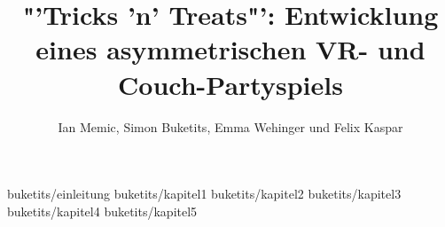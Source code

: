 \documentclass[diplom,german]{hgbthesis}
\begin{document}

%
%
%

%	

\title{"'Tricks 'n' Treats"': Entwicklung eines asymmetrischen VR- und Couch-Partyspiels}
\author{Ian Memic, Simon Buketits, Emma Wehinger und Felix Kaspar}

\frontmatter
\maketitle
\tableofcontents


\mainmatter         %


 {buketits/einleitung}
 {buketits/kapitel1}
 {buketits/kapitel2}
 {buketits/kapitel3}
 {buketits/kapitel4}
 {buketits/kapitel5}
\end{document}
